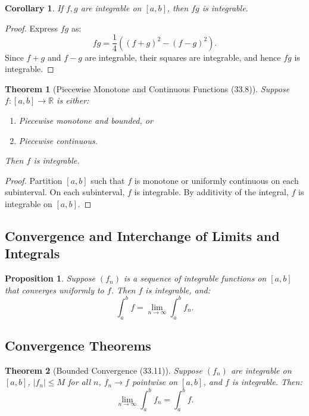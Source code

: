 \documentclass[9pt]{article}
\theoremstyle{definition}
\theoremstyle{plain}
\newtheorem{theorem}{Theorem}
\newtheorem{proposition}{Proposition}
\newtheorem{corollary}{Corollary}
\begin{document}
\begin{corollary}
If \( f, g \) are integrable on \( [a, b] \), then \( fg \) is integrable.
\end{corollary}

\begin{proof}
Express \( fg \) as:
\[
fg = \frac{1}{4} \left( (f + g)^2 - (f - g)^2 \right).
\]
Since \( f + g \) and \( f - g \) are integrable, their squares are integrable, and hence \( fg \) is integrable.
\end{proof}

\begin{theorem}[Piecewise Monotone and Continuous Functions (33.8)]
Suppose \( f : [a, b] \to \mathbb{R} \) is either:
\begin{enumerate}
    \item Piecewise monotone and bounded, or
    \item Piecewise continuous.
\end{enumerate}
Then \( f \) is integrable.
\end{theorem}

\begin{proof}
Partition \( [a, b] \) such that \( f \) is monotone or uniformly continuous on each subinterval. On each subinterval, \( f \) is integrable. By additivity of the integral, \( f \) is integrable on \( [a, b] \).
\end{proof}

\subsection*{Convergence and Interchange of Limits and Integrals}
\begin{proposition}
Suppose \( (f_n) \) is a sequence of integrable functions on \( [a, b] \) that converges uniformly to \( f \). Then \( f \) is integrable, and:
\[
\int_a^b f = \lim_{n \to \infty} \int_a^b f_n.
\]
\end{proposition}

\subsection*{Convergence Theorems}
\begin{theorem}[Bounded Convergence (33.11)]
Suppose \( (f_n) \) are integrable on \( [a, b] \), \( |f_n| \leq M \) for all \( n \), \( f_n \to f \) pointwise on \( [a, b] \), and \( f \) is integrable. Then:
\[
\lim_{n \to \infty} \int_a^b f_n = \int_a^b f.
\]
\end{theorem}
\end{document}
